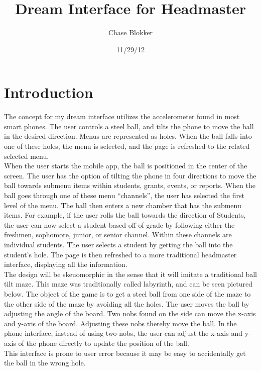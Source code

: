 \documentclass{article}
\title{Dream Interface for Headmaster}
\author{Chase Blokker}
\date{11/29/12}
\begin{document}
\maketitle


\section{Introduction}
\label{Introduction}

The concept for my dream interface utilizes the accelerometer found in most smart phones.  The user controls a steel ball, and tilts the phone to move the ball in the desired direction.  Menus are represented as holes.  When the ball falls into one of these holes, the menu is selected, and the page is refreshed to the related selected menu.\\

When the user starts the mobile app, the ball is positioned in the center of the screen.   The user has the option of tilting the phone in four directions to move the ball towards submenu items within students, grants, events, or reports.  When the ball goes through one of these menu “channels”, the user has selected the first level of the menu.  The ball then enters a new chamber that has the submenu items.  For example, if the user rolls the ball towards the direction of Students, the user can now select a student based off of grade by following either the freshmen, sophomore, junior, or senior channel.  Within these channels are individual students.  The user selects a student by getting the ball into the student’s hole.  The page is then refreshed to a more traditional headmaster interface, displaying all the information.\\

The design will be skeuomorphic in the sense that it will imitate a traditional ball tilt maze.  This maze was traditionally called labyrinth, and can be seen pictured below.  The object of the game is to get a steel ball from one side of the maze to the other side of the maze by avoiding all the holes.  The user moves the ball by adjusting the angle of the board.  Two nobs found on the side can move the x-axis and y-axis of the board.  Adjusting these nobs thereby move the ball.  In the phone interface, instead of using two nobs, the user can adjust the x-axis and y-axis of the phone directly to update the position of the ball.\\

This interface is prone to user error because it may be easy to accidentally get the ball in the wrong hole.
\end{document}
